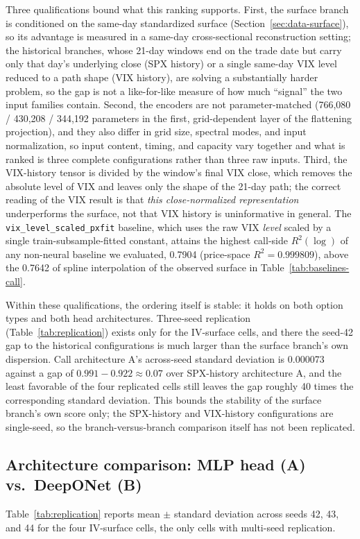 \documentclass[11pt]{article}
\begin{document}
Three qualifications bound what this ranking supports. First, the surface branch is conditioned on the
same-day standardized surface (Section~\ref{sec:data-surface}), so its advantage is measured in a
same-day cross-sectional reconstruction setting; the historical branches, whose 21-day windows end on
the trade date but carry only that day's underlying close (SPX history) or a single same-day VIX level
reduced to a path shape (VIX history), are solving a substantially harder problem, so the gap is not a
like-for-like measure of how much ``signal'' the two input families contain. Second, the encoders are
not parameter-matched (766{,}080 / 430{,}208 / 344{,}192 parameters in the first, grid-dependent
layer of the flattening projection), and they also differ in grid size, spectral modes, and input
normalization, so input content, timing, and capacity vary together and what is ranked is three
complete configurations rather than three raw inputs. Third, the VIX-history tensor is divided by
the window's final VIX close, which removes the absolute level of VIX and leaves only the shape of
the 21-day path; the correct reading of the VIX result is that \emph{this close-normalized
representation} underperforms the surface, not that VIX history is uninformative in general. The
\texttt{vix\_level\_scaled\_pxfit} baseline, which uses the raw VIX \emph{level} scaled by a single
train-subsample-fitted constant, attains the highest call-side $R^2(\log)$ of any non-neural
baseline we evaluated, 0.7904 (price-space $R^2 = 0.999809$), above the 0.7642 of spline
interpolation of the observed surface in Table~\ref{tab:baselines-call}.

Within these qualifications, the ordering itself is stable: it holds on both option types and both
head architectures. Three-seed replication (Table~\ref{tab:replication}) exists only for the IV-surface
cells, and there the seed-42 gap to the historical configurations is much larger than the surface
branch's own dispersion. Call architecture A's across-seed standard deviation is 0.000073 against a gap
of $0.991 - 0.922 \approx 0.07$ over SPX-history architecture A, and the least favorable of the four
replicated cells still leaves the gap roughly 40 times the corresponding standard deviation. This
bounds the stability of the surface branch's own score only; the SPX-history and VIX-history
configurations are single-seed, so the branch-versus-branch comparison itself has not been replicated.

\subsection{Architecture comparison: MLP head (A) vs.\ DeepONet (B)}
\label{sec:results-ab}
Table~\ref{tab:replication} reports mean $\pm$ standard deviation across seeds 42, 43, and 44 for the
four IV-surface cells, the only cells with multi-seed replication.
\end{document}
